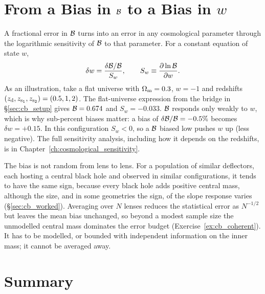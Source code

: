 \section{From a Bias in \texorpdfstring{$\mathcal{B}$}{B} to a Bias in \texorpdfstring{$w$}{w}}
\label{sec:cb_w}

A fractional error in $\mathcal{B}$ turns into an error in any cosmological
parameter through the logarithmic sensitivity of $\mathcal{B}$ to that
parameter. For a constant equation of state $w$,
\begin{equation}
  \delta w = \frac{\delta\mathcal{B}/\mathcal{B}}{S_w},
  \qquad
  S_w \equiv \frac{\partial \ln\mathcal{B}}{\partial w} .
  \label{eq:cb_dw}
\end{equation}
As an illustration, take a flat universe with $\Omega_{\mathrm{m}}=0.3$, $w=-1$ and
redshifts $(z_{\rm d},z_{\rm s_1},z_{\rm s_2})=(0.5,1,2)$. The
flat-universe expression from the bridge in \S\ref{sec:cb_setup} gives
$\mathcal{B}=0.674$ and $S_w=-0.033$. $\mathcal{B}$ responds only weakly to $w$,
which is why sub-percent biases matter: a bias of
$\delta\mathcal{B}/\mathcal{B}=-0.5\%$ becomes $\delta w=+0.15$. In this
configuration $S_w<0$, so a $\mathcal{B}$ biased low pushes $w$ up (less
negative). The full sensitivity analysis, including how it depends on
the redshifts, is in Chapter~\ref{ch:cosmological_sensitivity}.

\begin{keybox}
The bias is not random from lens to lens. For a population of similar
deflectors, each hosting a central black hole and observed in similar
configurations, it tends to have the same sign, because every black hole
adds positive central mass, although the size, and in some geometries
the sign, of the slope response varies (\S\ref{sec:cb_worked}).
Averaging over $N$ lenses reduces the statistical error as $N^{-1/2}$
but leaves the mean bias unchanged,
so beyond a modest sample size the unmodelled central mass dominates the
error budget (Exercise~\ref{ex:cb_coherent}). It has to be modelled, or
bounded with independent information on the inner mass; it cannot be
averaged away.
\end{keybox}


\section{Summary}
\label{sec:cb_summary}

